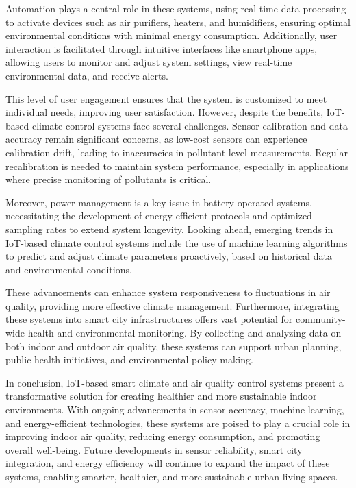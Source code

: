\documentclass[a4paper]{scrartcl}
\begin{document}
Automation plays a central role in these systems, using real-time data processing to activate devices such as air purifiers, heaters, and humidifiers, ensuring optimal environmental conditions with minimal energy consumption. Additionally, user interaction is facilitated through intuitive interfaces like smartphone apps, allowing users to monitor and adjust system settings, view real-time environmental data, and receive alerts.

This level of user engagement ensures that the system is customized to meet individual needs, improving user satisfaction. However, despite the benefits, IoT-based climate control systems face several challenges. Sensor calibration and data accuracy remain significant concerns, as low-cost sensors can experience calibration drift, leading to inaccuracies in pollutant level measurements. Regular recalibration is needed to maintain system performance, especially in applications where precise monitoring of pollutants is critical.

Moreover, power management is a key issue in battery-operated systems, necessitating the development of energy-efficient protocols and optimized sampling rates to extend system longevity. Looking ahead, emerging trends in IoT-based climate control systems include the use of machine learning algorithms to predict and adjust climate parameters proactively, based on historical data and environmental conditions.

These advancements can enhance system responsiveness to fluctuations in air quality, providing more effective climate management. Furthermore, integrating these systems into smart city infrastructures offers vast potential for community-wide health and environmental monitoring. By collecting and analyzing data on both indoor and outdoor air quality, these systems can support urban planning, public health initiatives, and environmental policy-making.

In conclusion, IoT-based smart climate and air quality control systems present a transformative solution for creating healthier and more sustainable indoor environments. With ongoing advancements in sensor accuracy, machine learning, and energy-efficient technologies, these systems are poised to play a crucial role in improving indoor air quality, reducing energy consumption, and promoting overall well-being. Future developments in sensor reliability, smart city integration, and energy efficiency will continue to expand the impact of these systems, enabling smarter, healthier, and more sustainable urban living spaces.
\end{document}
